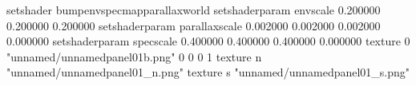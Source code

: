 setshader bumpenvspecmapparallaxworld
setshaderparam envscale 0.200000 0.200000 0.200000
setshaderparam parallaxscale 0.002000 0.002000 0.002000 0.000000
setshaderparam specscale 0.400000 0.400000 0.400000 0.000000
texture 0 "unnamed/unnamedpanel01b.png" 0 0 0 1
texture n "unnamed/unnamedpanel01_n.png"
texture s "unnamed/unnamedpanel01_s.png"